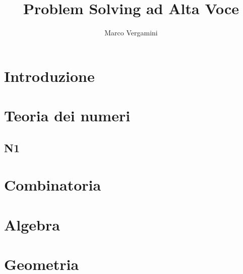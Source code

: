 \documentclass{article}
\title{Problem Solving ad Alta Voce}
\date{}
\author{Marco Vergamini}
\begin{document}
\maketitle
\newpage
\tableofcontents
\newpage


\section{Introduzione}


\newpage

\section{Teoria dei numeri}

\subsection{N1}


\newpage

\section{Combinatoria}

\newpage

\section{Algebra}

\newpage

\section{Geometria}
\end{document}
